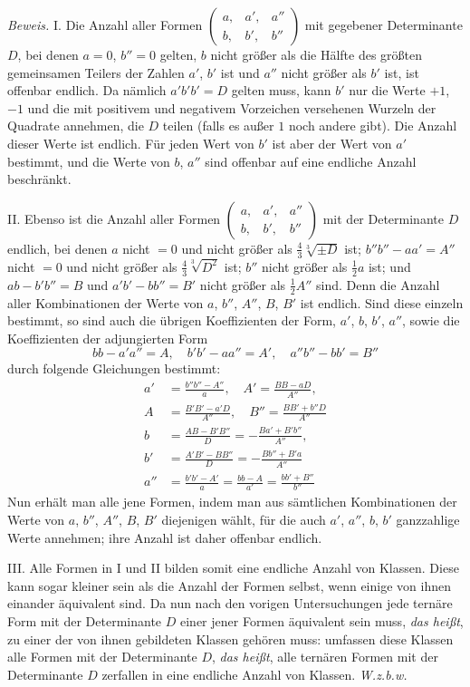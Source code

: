 \emph{Beweis.} I. Die Anzahl aller Formen \(\left(\begin{smallmatrix}a,&a',&a''\\b,&b',&b''\end{smallmatrix}\right)\) mit gegebener Determinante \(D\), bei denen \(a=0\), \(b''=0\) gelten, \(b\) nicht größer als die Hälfte des größten gemeinsamen Teilers der Zahlen \(a'\), \(b'\) ist und \(a''\) nicht größer als \(b'\) ist, ist offenbar endlich. Da nämlich \(a'b'b'=D\) gelten muss, kann \(b'\) nur die Werte \(+1\), \(-1\) und die mit positivem und negativem Vorzeichen versehenen Wurzeln der Quadrate annehmen, die \(D\) teilen (falls es außer \(1\) noch andere gibt). Die Anzahl dieser Werte ist endlich. Für jeden Wert von \(b'\) ist aber der Wert von \(a'\) bestimmt, und die Werte von \(b\), \(a''\) sind offenbar auf eine endliche Anzahl beschränkt.

II. Ebenso ist die Anzahl aller Formen \(\left(\begin{smallmatrix}a,&a',&a''\\b,&b',&b''\end{smallmatrix}\right)\) mit der Determinante \(D\) endlich, bei denen \(a\) nicht \(=0\) und nicht größer als \(\frac{4}{3}\sqrt[3]{\pm D}\) ist; \(b''b''-aa'=A''\) nicht \(=0\) und nicht größer als \(\frac{4}{3}\sqrt[3]{D^2}\) ist; \(b''\) nicht größer als \(\frac{1}{2}a\) ist; und \(ab-b'b''=B\) und \(a'b'-bb''=B'\) nicht größer als \(\frac{1}{2}A''\) sind. Denn die Anzahl aller Kombinationen der Werte von \(a\), \(b''\), \(A''\), \(B\), \(B'\) ist endlich. Sind diese einzeln bestimmt, so sind auch die übrigen Koeffizienten der Form, \(a'\), \(b\), \(b'\), \(a''\), sowie die Koeffizienten der adjungierten Form
\[
bb-a'a''=A,\quad b'b'-aa''=A',\quad a''b''-bb'=B''
\]
durch folgende Gleichungen bestimmt:
\[
\begin{aligned}
a'&=\frac{b''b''-A''}{a},\quad A'=\frac{BB-aD}{A''},\\
A&=\frac{B'B'-a'D}{A''},\quad B''=\frac{BB'+b''D}{A''}\\
b&=\frac{AB-B'B''}{D}=-\frac{Ba'+B'b''}{A''},\\
b'&=\frac{A'B'-BB''}{D}=-\frac{Bb''+B'a}{A''}\\
a''&=\frac{b'b'-A'}{a}=\frac{bb-A}{a'}=\frac{bb'+B''}{b''}
\end{aligned}
\]
Nun erhält man alle jene Formen, indem man aus sämtlichen Kombinationen der Werte von \(a\), \(b''\), \(A''\), \(B\), \(B'\) diejenigen wählt, für die auch \(a'\), \(a''\), \(b\), \(b'\) ganzzahlige Werte annehmen; ihre Anzahl ist daher offenbar endlich.

III. Alle Formen in I und II bilden somit eine endliche Anzahl von Klassen. Diese kann sogar kleiner sein als die Anzahl der Formen selbst, wenn einige von ihnen einander äquivalent sind. Da nun nach den vorigen Untersuchungen jede ternäre Form mit der Determinante \(D\) einer jener Formen äquivalent sein muss, \emph{das heißt}, zu einer der von ihnen gebildeten Klassen gehören muss: umfassen diese Klassen alle Formen mit der Determinante \(D\), \emph{das heißt}, alle ternären Formen mit der Determinante \(D\) zerfallen in eine endliche Anzahl von Klassen. \emph{W.z.b.w.}
